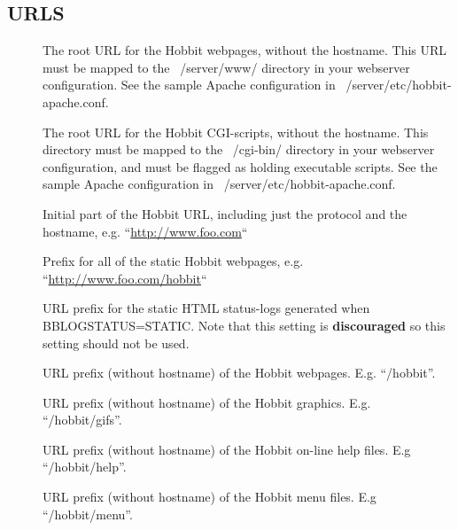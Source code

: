 \subsection{URLS}
\begin{description}
\item[] The root URL for the Hobbit webpages,
  without the hostname. This URL must be mapped to the ~/server/www/
  directory in your webserver configuration. See the sample Apache
  configuration in ~/server/etc/hobbit-apache.conf. 


 

\item[] The root URL for the Hobbit CGI-scripts,
  without the hostname. This directory must be mapped to the
  ~/cgi-bin/ directory in your webserver configuration, and must be
  flagged as holding executable scripts. See the sample Apache
  configuration in ~/server/etc/hobbit-apache.conf. 


 

\item[] Initial part of the Hobbit URL, including
  just the protocol and the hostname,
  e.g. ``\url{http://www.foo.com}`` 


 

\item[] Prefix for all of the static Hobbit
  webpages, e.g. ``\url{http://www.foo.com/hobbit}`` 


 

\item[] URL prefix for the static HTML
  status-logs generated when BBLOGSTATUS=STATIC. Note that this
  setting is \textbf{discouraged} so this setting should not be used. 

 

\item[] URL prefix (without hostname) of the Hobbit webpages. E.g. ``/hobbit''. 

 

\item[] URL prefix (without hostname) of the Hobbit graphics. E.g. ``/hobbit/gifs''. 

 

\item[] URL prefix (without hostname) of the Hobbit on-line help files. E.g ``/hobbit/help''. 

 

\item[] URL prefix (without hostname) of the Hobbit menu files. E.g ``/hobbit/menu''. 


\end{description}
